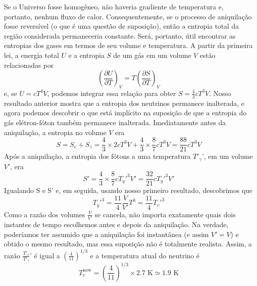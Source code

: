 \documentclass[12pt]{article}
\begin{document}
Se o Universo fosse homogêneo, não haveria gradiente de temperatura e, portanto, nenhum fluxo de calor. Consequentemente, se o processo de aniquilação fosse reversível (o que é uma questão de suposição), então a entropia total da região considerada permaneceria constante. Será, portanto, útil encontrar as entropias dos gases em termos de seu volume e temperatura. A partir da primeira lei, a energia total $U$ e a entropia $S$ de um gás em um volume $V$ estão relacionadas por 
\[
\left( \frac{\partial U}{\partial T} \right)_V = T \left( \frac{\partial S}{\partial T} \right)_V
\]
 e, se $U = cT^4V$, podemos integrar essa relação para obter $ S = \frac{4}{3}cT^3V$. Nosso resultado anterior mostra que a entropia dos neutrinos permanece inalterada, e agora podemos descobrir o que está implícito na suposição de que a entropia do gás elétron-fóton também permanece inalterada. Imediatamente antes da aniquilação, a entropia no volume $V$ era
\[
S = S_e + S_\gamma = \frac{4}{3} \times 2cT^3V + \frac{4}{3} \times \frac{8}{7} cT^3V = \frac{88}{21} cT^3V
\]
 Após a aniquilação, a entropia dos fótons a uma temperatura $T'_\gamma$', em um volume $V'$, era 
 \[
 S' = \frac{4}{3} \times \frac{8}{7} c T_y'^3 V' = \frac{32}{21} c T_y'^3 V'
 \]
 Igualando S e S' e, em seguida, usando nosso primeiro resultado, descobrimos que 
 \[
 T_y'^3 = \frac{11}{4} \frac{V}{V'} T^3 = \frac{11}{4} T_v'^3
 \]
Como a razão dos volumes $\frac{V}{V'}$ se cancela, não importa exatamente quais dois instantes de tempo escolhemos antes e depois da aniquilação. Na verdade, poderíamos ter assumido que a aniquilação foi instantânea (e assim $V' = V$) e obtido o mesmo resultado, mas essa suposição não é totalmente realista. Assim, a razão $\frac{T'_\nu}{T'_\gamma}$' é igual a $\left( \frac{4}{11} \right)^{1/3}$ e a temperatura atual do neutrino é 
\[
T_v^\text{now} = \left( \frac{4}{11} \right)^{1/3} \times 2.7 \text{ K} \simeq 1.9 \text{ K}
\]
\end{document}
